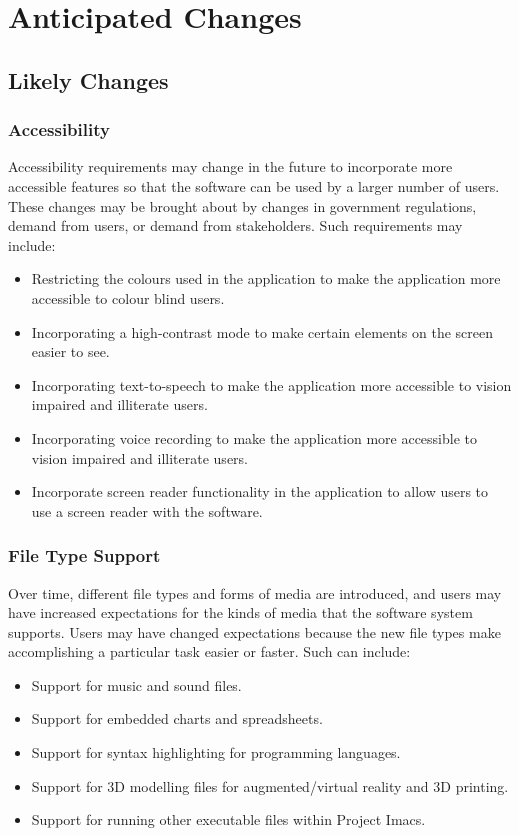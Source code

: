 \documentclass{article}
\begin{document}
\section{Anticipated Changes}
\subsection{Likely Changes}
\subsubsection{Accessibility}
Accessibility requirements may change in the future to incorporate more accessible features so that the software can be used by a larger number of users. These changes may be brought about by changes in government regulations, demand from users, or demand from stakeholders. Such requirements may include:

\begin{itemize}
\item Restricting the colours used in the application to make the application more accessible to colour blind users.
\item Incorporating a high-contrast mode to make certain elements on the screen easier to see.
\item Incorporating text-to-speech to make the application more accessible to vision impaired and illiterate users.
\item Incorporating voice recording to make the application more accessible to vision impaired and illiterate users.
\item Incorporate screen reader functionality in the application to allow users to use a screen reader with the software.
\end{itemize}

\subsubsection{File Type Support}
Over time, different file types and forms of media are introduced, and users may have increased expectations for the kinds of media that the software system supports. Users may have changed expectations because the new file types make accomplishing a particular task easier or faster. Such can include:

\begin{itemize}
\item Support for music and sound files.
\item Support for embedded charts and spreadsheets.
\item Support for syntax highlighting for programming languages.
\item Support for 3D modelling files for augmented/virtual reality and 3D printing.
\item Support for running other executable files within Project Imacs.
\end{itemize}
\end{document}
